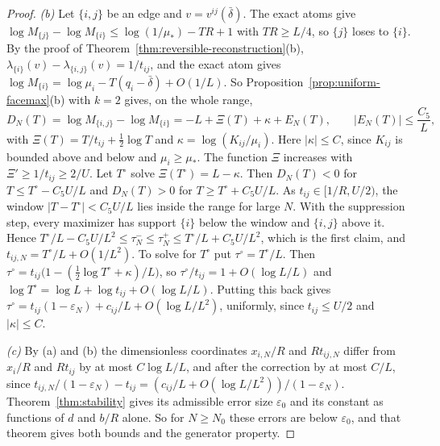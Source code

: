 \begin{proof}
\emph{(b)} Let $\{i,j\}$ be an edge and $v=v^{ij}(\bar\delta)$. The exact atoms give
$\log M_{\{j\}}-\log M_{\{i\}}\le\log(1/\mu_*)-TR+1$ with $TR\ge L/4$, so $\{j\}$ loses to
$\{i\}$. By the proof of Theorem~\ref{thm:reversible-reconstruction}(b),
$\lambda_{\{i\}}(v)-\lambda_{\{i,j\}}(v)=1/t_{ij}$, and the exact atom gives
$\log M_{\{i\}}=\log\mu_i-T(q_i-\bar\delta)+O(1/L)$. So
Proposition~\ref{prop:uniform-facemax}(b) with $k=2$ gives, on the whole range,
\[
 D_N(T)=\log M_{\{i,j\}}-\log M_{\{i\}}=-L+\Xi(T)+\kappa+E_N(T),\qquad|E_N(T)|\le\frac{C_5}L,
\]
with $\Xi(T)=T/t_{ij}+\frac12\log T$ and $\kappa=\log(K_{ij}/\mu_i)$. Here
$|\kappa|\le C$, since $K_{ij}$ is bounded above and below and $\mu_i\ge\mu_*$.
The function $\Xi$ increases with $\Xi'\ge1/t_{ij}\ge2/U$. Let $T^\circ$ solve
$\Xi(T^\circ)=L-\kappa$. Then $D_N(T)<0$ for $T\le T^\circ-C_5U/L$ and
$D_N(T)>0$ for $T\ge T^\circ+C_5U/L$. As $t_{ij}\in[1/R,U/2)$, the window
$|T-T^\circ|<C_5U/L$ lies inside the range for large $N$. With the suppression
step, every maximizer has support $\{i\}$ below the window and $\{i,j\}$ above
it. Hence $T^\circ/L-C_5U/L^2\le\tau^-_N\le\tau^+_N\le T^\circ/L+C_5U/L^2$,
which is the first claim, and $t_{ij,N}=T^\circ/L+O(1/L^2)$. To solve for
$T^\circ$ put $\tau^\circ=T^\circ/L$. Then
$\tau^\circ=t_{ij}\bigl(1-(\frac12\log T^\circ+\kappa)/L\bigr)$, so
$\tau^\circ/t_{ij}=1+O(\log L/L)$ and
$\log T^\circ=\log L+\log t_{ij}+O(\log L/L)$. Putting this back gives
$\tau^\circ=t_{ij}(1-\varepsilon_N)+c_{ij}/L+O(\log L/L^2)$, uniformly, since
$t_{ij}\le U/2$ and $|\kappa|\le C$.

\emph{(c)} By (a) and (b) the dimensionless coordinates $x_{i,N}/R$ and
$Rt_{ij,N}$ differ from $x_i/R$ and $Rt_{ij}$ by at most $C\log L/L$, and after
the correction by at most $C/L$, since
$t_{ij,N}/(1-\varepsilon_N)-t_{ij}=(c_{ij}/L+O(\log L/L^2))/(1-\varepsilon_N)$.
Theorem~\ref{thm:stability} gives its admissible error size $\varepsilon_0$ and
its constant as functions of $d$ and $b/R$ alone. So for $N\ge N_0$ these errors
are below $\varepsilon_0$, and that theorem gives both bounds and the generator
property.
\end{proof}

